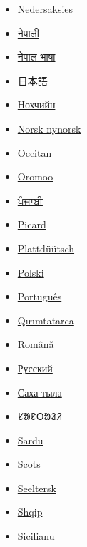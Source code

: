 \documentclass[11pt,a4paper]{article}
\begin{document}
\begin{itemize}
\item \href{https://nds-nl.wikipedia.org/wiki/Ente}{Nedersaksies}
\item \href{https://ne.wikipedia.org/wiki/\%E0\%A4\%B9\%E0\%A4\%BE\%E0\%A4\%81\%E0\%A4\%B8}{नेपाली}
\item \href{https://new.wikipedia.org/wiki/\%E0\%A4\%B9\%E0\%A4\%81\%E0\%A4\%AF\%E0\%A5\%8D}{नेपाल भाषा}
\item \href{https://ja.wikipedia.org/wiki/\%E3\%82\%AB\%E3\%83\%A2}{日本語}
\item \href{https://ce.wikipedia.org/wiki/\%D0\%91\%D0\%B5\%D0\%B4\%D0\%B0\%D1\%88}{Нохчийн}
\item \href{https://nn.wikipedia.org/wiki/And}{Norsk nynorsk}
\item \href{https://oc.wikipedia.org/wiki/Guit}{Occitan}
\item \href{https://om.wikipedia.org/wiki/Daakiyyee}{Oromoo}
\item \href{https://pa.wikipedia.org/wiki/\%E0\%A8\%AC\%E0\%A8\%A4\%E0\%A8\%96\%E0\%A8\%BC}{ਪੰਜਾਬੀ}
\item \href{https://pcd.wikipedia.org/wiki/Can\%C3\%A8rd}{Picard}
\item \href{https://nds.wikipedia.org/wiki/Aanten}{Plattdüütsch}
\item \href{https://pl.wikipedia.org/wiki/Kaczka}{Polski}
\item \href{https://pt.wikipedia.org/wiki/Pato}{Português}
\item \href{https://crh.wikipedia.org/wiki/Papiy}{Qırımtatarca}
\item \href{https://ro.wikipedia.org/wiki/Ra\%C8\%9B\%C4\%83}{Română}
\item \href{https://ru.wikipedia.org/wiki/\%D0\%A3\%D1\%82\%D0\%BA\%D0\%B8}{Русский}
\item \href{https://sah.wikipedia.org/wiki/\%D0\%9A\%D1\%83\%D1\%81\%D1\%82\%D0\%B0\%D1\%80}{Саха тыла}
\item \href{https://sat.wikipedia.org/wiki/\%E1\%B1\%9C\%E1\%B1\%AE\%E1\%B1\%B0\%E1\%B1\%AE}{ᱥᱟᱱᱛᱟᱲᱤ}
\item \href{https://sc.wikipedia.org/wiki/Anade}{Sardu}
\item \href{https://sco.wikipedia.org/wiki/Deuk}{Scots}
\item \href{https://stq.wikipedia.org/wiki/Oante}{Seeltersk}
\item \href{https://sq.wikipedia.org/wiki/Rosa}{Shqip}
\item \href{https://scn.wikipedia.org/wiki/P\%C3\%A0para\_\%28\%C3\%A0natra\%29}{Sicilianu}

\end{itemize}
\end{document}
